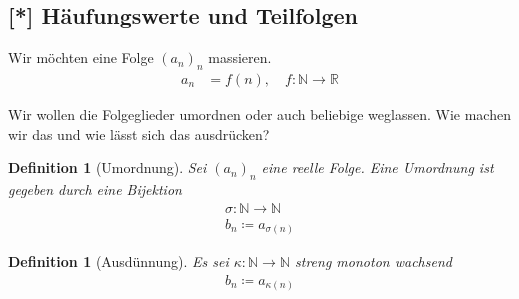 \documentclass[11pt, twoside, a4paper]{article}
\theoremstyle{plain}
\newtheorem{definition}[blockelement]{Definition}
\newcommand{\definedas}[0]{\coloneqq}
\newcommand{\anf}[1]{\glqq{}#1\grqq}
\newcommand{\fromto}{\rightarrow{}}
\newcommand{\naturalnumbers}{\mathbb{N}}
\newcommand{\realnumbers}{\mathbb{R}}
\begin{document}
    \newpage

    \subsection{[*] Häufungswerte und Teilfolgen}

    Wir möchten eine Folge $(a_n)_n$ \anf{massieren}.
    \begin{align*}
        a_n &= f(n), \quad f: \naturalnumbers \fromto \realnumbers
    \end{align*}

    \noindent Wir wollen die Folgeglieder umordnen oder auch beliebige weglassen. Wie machen wir das und wie lässt sich das ausdrücken?

    \begin{definition}[Umordnung]
        Sei $(a_n)_n$ eine reelle Folge. Eine Umordnung ist gegeben durch eine Bijektion
        \begin{align*}
            \sigma: \naturalnumbers\fromto \naturalnumbers\\
            b_n \definedas a_{\sigma(n)} \tag{Umordnung von $a_n$}
        \end{align*}
    \end{definition}

    \begin{definition}[Ausdünnung]
        Es sei $\kappa: \naturalnumbers\fromto\naturalnumbers$ streng monoton wachsend
        \begin{align*}
            b_n \definedas a_{\kappa(n)}\tag{Teilfolge von $a_n$}
        \end{align*}
    \end{definition}
\end{document}
